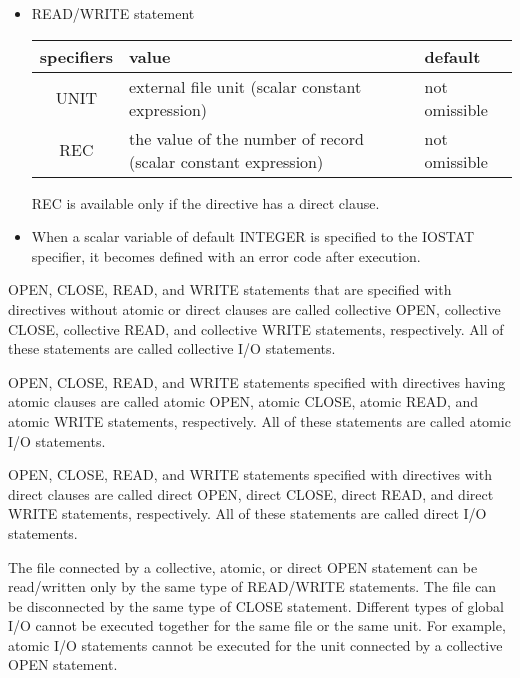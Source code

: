 \begin{itemize}
    \item READ/WRITE statement

   \begin{table}[h]
    \begin{center}
     \label{tb:globalopen}
     \begin{tabular}{|c||p{90mm}|l|}
       \hline
      specifiers & value & default \\ \hline \hline
      UNIT & external file unit (scalar constant expression)
      & not omissible \\ \hline
      REC & the value of the number of record (scalar constant expression)
      & not omissible \\ \hline
     \end{tabular}
    \end{center}
   \end{table}

   REC is available only if the directive has a direct clause.
   
   \item When a scalar variable of default INTEGER is specified to
		 the IOSTAT specifier, it becomes defined with an error code
		 after execution.
	 
   \end{itemize}

   OPEN, CLOSE, READ, and WRITE statements that are specified with \gio directives
   without atomic or direct clauses are called collective OPEN, collective
   CLOSE, collective READ, and collective WRITE statements, respectively.
   All of these statements are called collective I/O statements.

   OPEN, CLOSE, READ, and WRITE statements specified with \gio directives
   having atomic clauses are called atomic OPEN, atomic CLOSE, atomic READ, and
   atomic WRITE statements, respectively.
   All of these statements are called atomic I/O statements.

   OPEN, CLOSE, READ, and WRITE statements specified with \gio directives
   with direct clauses are called direct OPEN, direct CLOSE, direct READ, and
   direct WRITE statements, respectively.
   All of these statements are called direct I/O statements.

   The file connected by a collective, atomic, or direct OPEN statement can
   be read/written only by the same type of READ/WRITE statements.
   The file can be disconnected by the same type of CLOSE statement.
   Different types of global I/O cannot be executed together for the same file or the
   same unit.
   For example, atomic I/O statements cannot be executed for the unit
   connected by a collective OPEN statement.

